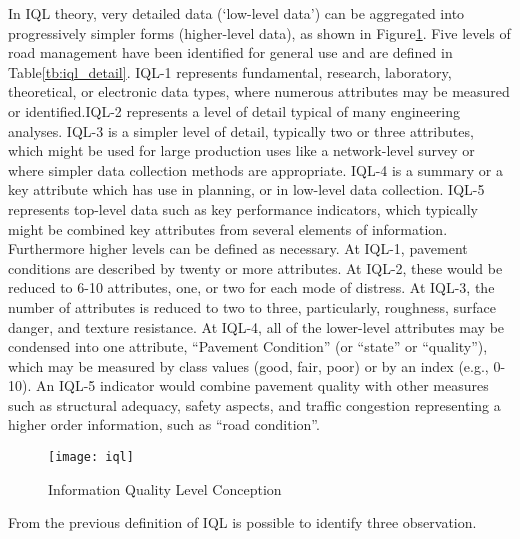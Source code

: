 \documentclass[tesi]{subfiles}
\begin{document}
In IQL theory, very detailed data (‘low-level data’) can be aggregated into progressively simpler forms (higher-level data), as shown in Figure\ref{fig:Information Quality Level Conception}. Five levels of road management have been identified for general use and are defined in Table\ref{tb:iql_detail}.
IQL-1 represents fundamental, research, laboratory, theoretical, or electronic data types, where numerous attributes may be measured or identified.IQL-2 represents a level of detail typical of many engineering analyses.
IQL-3 is a simpler level of detail, typically two or three attributes, which might be used for large production uses like a network-level survey or where simpler data collection methods are appropriate.
IQL-4 is a summary or a key attribute which has use in planning, or in low-level data collection.
IQL-5 represents top-level data such as key performance indicators, which typically might be combined key attributes from several elements of information. Furthermore higher levels can be defined as necessary. 
At IQL-1, pavement conditions are described by twenty or more attributes.
At IQL-2, these would be reduced to 6-10 attributes, one, or two for each mode of distress.
 At IQL-3, the number of attributes is reduced to two to three, particularly, roughness, surface danger, and texture resistance.
At IQL-4, all of the lower-level attributes may be condensed into one attribute, “Pavement Condition” (or “state” or “quality”), which may be measured by class values (good, fair, poor) or by an index (e.g., 0-10).
An IQL-5 indicator would combine pavement quality with other measures such as structural adequacy, safety aspects, and traffic congestion representing a higher order information, such as “road condition”.


\begin{figure}[H]
\centering
\texttt{[image: iql]}
\caption{Information Quality Level Conception}
\label{fig:Information Quality Level Conception}
\end{figure}

\clearpage
From the previous definition of IQL is possible to identify three observation.
\end{document}
